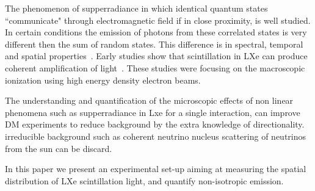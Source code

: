 The phenomenon of supperradiance in which identical quantum states ``communicate" through electromagnetic field if in close proximity, is well studied. In certain conditions the emission of photons from these correlated states is very different then the sum of random states. This difference is in spectral, temporal and spatial properties~\cite{DickeSR,GROSS1982301}. Early studies show that scintillation in LXe can produce coherent amplification of light~\cite{BasovSRTheory,MiesSRExp}. These studies were focusing on the macroscopic ionization using high energy density electron beams. 

The understanding and quantification of the microscopic effects of non linear phenomena such as supperradiance in Lxe for a single interaction, can improve DM experiments to reduce background by the extra knowledge of directionality. irreducible background such as coherent neutrino nucleus scattering of neutrinos from the sun can be discard.

In this paper we present an experimental set-up aiming at measuring the spatial distribution of LXe scintillation light, and quantify non-isotropic emission.     